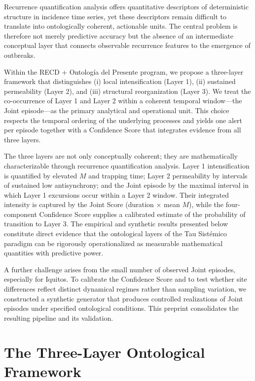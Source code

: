 \documentclass[11pt,a4paper]{article}
\begin{document}
Recurrence quantification analysis offers quantitative descriptors of deterministic structure in incidence time series, yet these descriptors remain difficult to translate into ontologically coherent, actionable units. The central problem is therefore not merely predictive accuracy but the absence of an intermediate conceptual layer that connects observable recurrence features to the emergence of outbreaks.

Within the RECD + Ontología del Presente program, we propose a three-layer framework that distinguishes (i) local intensification (Layer 1), (ii) sustained permeability (Layer 2), and (iii) structural reorganization (Layer 3). We treat the co-occurrence of Layer 1 and Layer 2 within a coherent temporal window—the Joint episode—as the primary analytical and operational unit. This choice respects the temporal ordering of the underlying processes and yields one alert per episode together with a Confidence Score that integrates evidence from all three layers.

The three layers are not only conceptually coherent; they are mathematically characterizable through recurrence quantification analysis. Layer 1 intensification is quantified by elevated $M$ and trapping time; Layer 2 permeability by intervals of sustained low antisynchrony; and the Joint episode by the maximal interval in which Layer 1 excursions occur within a Layer 2 window. Their integrated intensity is captured by the Joint Score (duration $\times$ mean $M$), while the four-component Confidence Score supplies a calibrated estimate of the probability of transition to Layer 3. The empirical and synthetic results presented below constitute direct evidence that the ontological layers of the Tau Sistémico paradigm can be rigorously operationalized as measurable mathematical quantities with predictive power.

A further challenge arises from the small number of observed Joint episodes, especially for Iquitos. To calibrate the Confidence Score and to test whether site differences reflect distinct dynamical regimes rather than sampling variation, we constructed a synthetic generator that produces controlled realizations of Joint episodes under specified ontological conditions. This preprint consolidates the resulting pipeline and its validation.

\section{The Three-Layer Ontological Framework}
\end{document}
